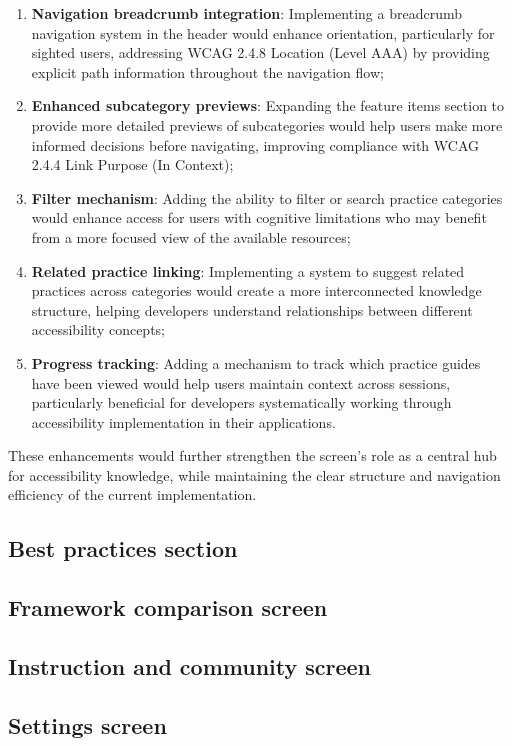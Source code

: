 \begin{enumerate}
    \item \textbf{Navigation breadcrumb integration}: Implementing a breadcrumb navigation system in the header would enhance orientation, particularly for sighted users, addressing WCAG 2.4.8 Location (Level AAA) by providing explicit path information throughout the navigation flow;
    
    \item \textbf{Enhanced subcategory previews}: Expanding the feature items section to provide more detailed previews of subcategories would help users make more informed decisions before navigating, improving compliance with WCAG 2.4.4 Link Purpose (In Context);
    
    \item \textbf{Filter mechanism}: Adding the ability to filter or search practice categories would enhance access for users with cognitive limitations who may benefit from a more focused view of the available resources;
    
    \item \textbf{Related practice linking}: Implementing a system to suggest related practices across categories would create a more interconnected knowledge structure, helping developers understand relationships between different accessibility concepts;
    
    \item \textbf{Progress tracking}: Adding a mechanism to track which practice guides have been viewed would help users maintain context across sessions, particularly beneficial for developers systematically working through accessibility implementation in their applications.
\end{enumerate}

These enhancements would further strengthen the screen's role as a central hub for accessibility knowledge, while maintaining the clear structure and navigation efficiency of the current implementation.

\subsection{Best practices section}

\subsection{Framework comparison screen}

\subsection{Instruction and community screen}

\subsection{Settings screen}

\newpage

